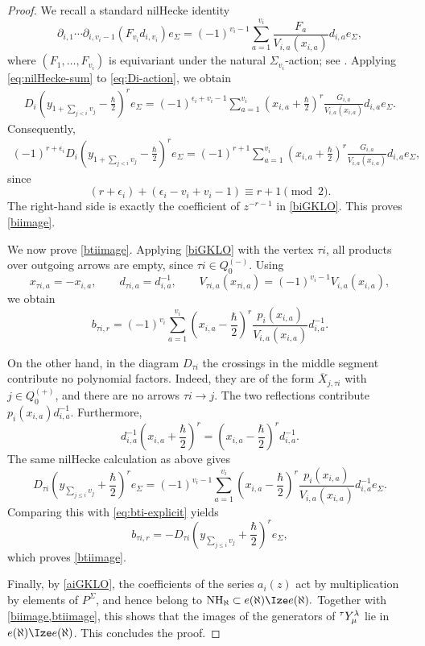 \begin{proof}
We recall a standard nilHecke identity
\begin{equation}
\label{eq:nilHecke-sum}
\partial_{i,1}\cdots\partial_{i,v_i-1}
\left(F_{v_i}d_{i,v_i}\right)e_\Sigma
=
(-1)^{v_i-1}
\sum_{a=1}^{v_i}
\frac{F_a}{V_{i,a}(x_{i,a})}
d_{i,a}e_\Sigma,
\end{equation}
where $(F_1,\ldots,F_{v_i})$ is equivariant under the natural
$\Sigma_{v_i}$-action; see \cite[Lem.~4.7]{KTWWY19}. Applying
\cref{eq:nilHecke-sum} to \cref{eq:Di-action}, we obtain
\begin{align*}
D_i
\left(
y_{1+\sum_{j<i}v_j}-\frac{\hbar}{2}
\right)^r e_\Sigma
=
(-1)^{\epsilon_i+v_i-1}
\sum_{a=1}^{v_i}
\left(x_{i,a}+\frac{\hbar}{2}\right)^r
\frac{G_{i,a}}{V_{i,a}(x_{i,a})}
d_{i,a}e_\Sigma.
\end{align*}
Consequently,
\begin{align*}
(-1)^{
r+\epsilon_i
}
D_i
\left(
y_{1+\sum_{j<i}v_j}-\frac{\hbar}{2}
\right)^r e_\Sigma
=
(-1)^{r+1}
\sum_{a=1}^{v_i}
\left(x_{i,a}+\frac{\hbar}{2}\right)^r
\frac{G_{i,a}}{V_{i,a}(x_{i,a})}
d_{i,a}e_\Sigma,
\end{align*}
since
\[
(r+\epsilon_i)+(\epsilon_i-v_i+v_i-1)
\equiv r+1\pmod 2.
\]
The right-hand side is exactly the coefficient of $z^{-r-1}$ in
\cref{biGKLO}. This proves \cref{biimage}.

We now prove \cref{btiimage}. Applying \cref{biGKLO} with the vertex
$\tau i$, all products over outgoing arrows are empty, since
$\tau i\in Q_0^{(-)}$. Using
\[
x_{\tau i,a}=-x_{i,a},
\qquad
d_{\tau i,a}=d_{i,a}^{-1},
\qquad
V_{\tau i,a}(x_{\tau i,a})
=
(-1)^{v_i-1}V_{i,a}(x_{i,a}),
\]
we obtain
\begin{equation}
\label{eq:bti-explicit}
b_{\tau i,r}
=
(-1)^{v_i}
\sum_{a=1}^{v_i}
\left(x_{i,a}-\frac{\hbar}{2}\right)^r
\frac{p_i(x_{i,a})}{V_{i,a}(x_{i,a})}
d_{i,a}^{-1}.
\end{equation}

On the other hand, in the diagram $D_{\tau i}$ the crossings in the
middle segment contribute no polynomial factors. Indeed, they are of
the form $\overline X_{j,\tau i}$ with $j\in Q_0^{(+)}$, and there are
no arrows $\tau i\to j$. The two reflections contribute
$p_i(x_{i,a})d_{i,a}^{-1}$. Furthermore,
\[
d_{i,a}^{-1}
\left(x_{i,a}+\frac{\hbar}{2}\right)^r
=
\left(x_{i,a}-\frac{\hbar}{2}\right)^r
d_{i,a}^{-1}.
\]
The same nilHecke calculation as above gives
\[
D_{\tau i}
\left(
y_{\sum_{j\leq i}v_j}+\frac{\hbar}{2}
\right)^r e_\Sigma
=
(-1)^{v_i-1}
\sum_{a=1}^{v_i}
\left(x_{i,a}-\frac{\hbar}{2}\right)^r
\frac{p_i(x_{i,a})}{V_{i,a}(x_{i,a})}
d_{i,a}^{-1}e_\Sigma.
\]
Comparing this with \cref{eq:bti-explicit} yields
\[
b_{\tau i,r}
=
-
D_{\tau i}
\left(
y_{\sum_{j\leq i}v_j}+\frac{\hbar}{2}
\right)^r e_\Sigma,
\]
which proves \cref{btiimage}.

Finally, by \cref{aiGKLO}, the coefficients of the series $a_i(z)$ act
by multiplication by elements of $P^\Sigma$, and hence belong to
\(
\NH\subset e(\aleph)\tR e(\aleph).
\)
Together with \cref{biimage,btiimage}, this shows that the images of
the generators of ${}^\tau Y_\mu^\lambda$ lie in $e(\aleph)\tR e(\aleph)$. This concludes the proof.
\end{proof}

